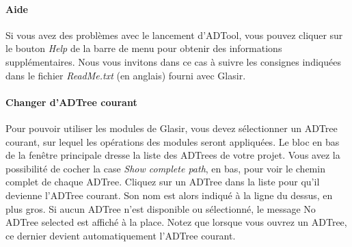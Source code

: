 \paragraph{Aide} Si vous avez des problèmes avec le lancement d'ADTool, vous pouvez cliquer sur le bouton \emph{Help} de la barre de menu pour obtenir des informations supplémentaires. Nous vous invitons dans ce cas à suivre les consignes indiquées dans le fichier \emph{ReadMe.txt} (en anglais) fourni avec Glasir.

\paragraph{Changer d'ADTree courant} Pour pouvoir utiliser les modules de Glasir, vous devez sélectionner un ADTree courant, sur lequel les opérations des modules seront appliquées. Le bloc en bas de la fenêtre principale dresse la liste des ADTrees de votre projet.  Vous avez la possibilité de cocher la case \emph{Show complete path}, en bas, pour voir le chemin complet de chaque ADTree. Cliquez sur un ADTree dans la liste pour qu'il devienne l'ADTree courant. Son nom est alors indiqué à la ligne du dessus, en plus gros. Si aucun ADTree n'est disponible ou sélectionné, le message \og No ADTree selected \fg{} est affiché à la place. Notez que lorsque vous ouvrez un ADTree, ce dernier devient automatiquement l'ADTree courant.

